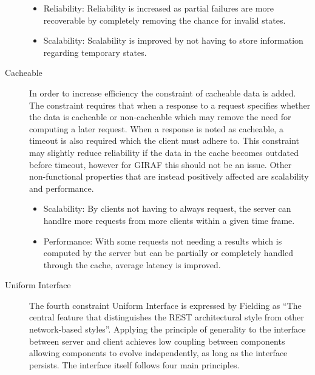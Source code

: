 \begin{description}
\begin{itemize}
        \item Reliability: Reliability is increased as partial failures are more recoverable by completely removing the chance for invalid states.
        \item Scalability: Scalability is improved by not having to store information regarding temporary states.
    \end{itemize}
    \item [Cacheable] In order to increase efficiency the constraint of cacheable data is added.
    The constraint requires that when a response to a request specifies whether the data is cacheable or non-cacheable which may remove the need for computing a later request.
    When a response is noted as cacheable, a timeout is also required which the client must adhere to.
    This constraint may slightly reduce reliability if the data in the cache becomes outdated before timeout, however for GIRAF this should not be an issue. 
    Other non-functional properties that are instead positively affected are scalability and performance.
    \begin{itemize}
        \item Scalability: By clients not having to always request, the server can handlre more requests from more clients within a given time frame.
        \item Performance: With some requests not needing a results which is computed by the server but can be partially or completely handled through the cache, average latency is improved.
    \end{itemize}
    \item [Uniform Interface] The fourth constraint Uniform Interface is expressed by Fielding as \enquote{The central feature that distinguishes the REST architectural style from other network-based styles}\citep{fielding2000rest}.
    Applying the principle of generality to the interface between server and client achieves low coupling between components allowing components to evolve independently, as long as the interface persists. 
    The interface itself follows four main principles.


\end{description}
